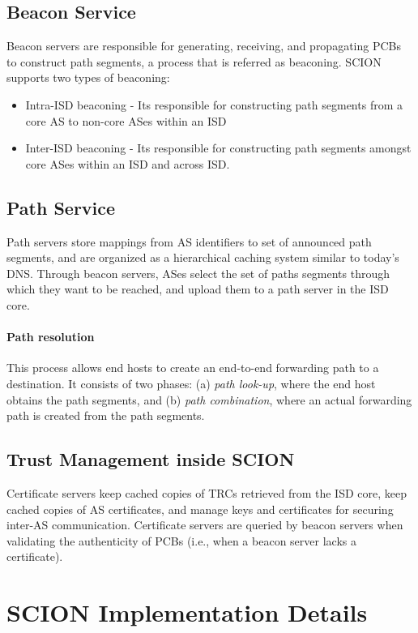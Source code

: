 \subsection{Beacon Service}
Beacon servers are responsible for generating, receiving, and propagating PCBs to construct path segments, a process that is referred as beaconing. SCION supports two types of beaconing:
\begin{itemize}
    \item Intra-ISD beaconing - Its responsible for constructing path segments from a core AS to non-core ASes within an ISD
    \item Inter-ISD beaconing - Its responsible for constructing path segments amongst core ASes within an ISD and across ISD.
\end{itemize}

\subsection{Path Service}
Path servers store mappings from AS identifiers to set of announced path segments, and are organized as a hierarchical caching system similar to today's DNS. Through beacon servers, ASes select the set of paths segments through which they want to be reached, and upload them to a path server in the ISD core.

\paragraph{Path resolution}
This process allows end hosts to create an end-to-end forwarding path to a destination. It consists of two phases: (a) \textit{path look-up}, where the end host obtains the path segments, and (b) \textit{path combination}, where an actual forwarding path is created from the path segments.

\subsection{Trust Management inside SCION} \label{sec:cert_server}
Certificate servers keep cached copies of TRCs retrieved from the ISD core, keep cached copies of AS certificates, and manage keys and certificates for securing inter-AS communication. Certificate servers are queried by beacon servers when validating the authenticity of PCBs (i.e., when a beacon server lacks a certificate).

\section{SCION Implementation Details} \label{sec:scion_impl}

